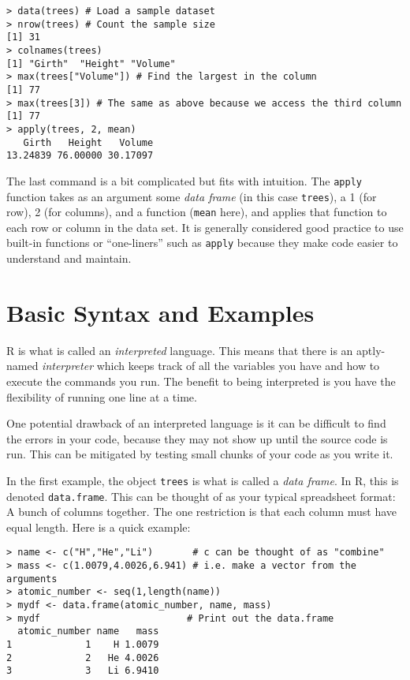 \documentclass[12pt]{article}
\begin{document}
\begin{verbatim}
> data(trees) # Load a sample dataset
> nrow(trees) # Count the sample size
[1] 31
> colnames(trees)
[1] "Girth"  "Height" "Volume"
> max(trees["Volume"]) # Find the largest in the column
[1] 77
> max(trees[3]) # The same as above because we access the third column
[1] 77
> apply(trees, 2, mean)
   Girth   Height   Volume 
13.24839 76.00000 30.17097
\end{verbatim}

The last command is a bit complicated but fits with intuition. The \verb|apply| function takes as an argument some \emph{data frame} (in this case \verb|trees|), a 1 (for row), 2 (for columns), and a function (\verb|mean| here), and applies that function to each row or column in the data set. It is generally considered good practice to use built-in functions or ``one-liners'' such as \verb|apply| because they make code easier to understand and maintain.

\section{Basic Syntax and Examples}

R is what is called an \emph{interpreted} language. This means that there is an aptly-named \emph{interpreter} which keeps track of all the variables you have and how to execute the commands you run. The benefit to being interpreted is you have the flexibility of running one line at a time.

One potential drawback of an interpreted language is it can be difficult to find the errors in your code, because they may not show up until the source code is run. This can be mitigated by testing small chunks of your code as you write it.

In the first example, the object \verb|trees| is what is called a \emph{data frame}. In R, this is denoted \verb|data.frame|. This can be thought of as your typical spreadsheet format: A bunch of columns together. The one restriction is that each column must have equal length. Here is a quick example:

\begin{verbatim}
> name <- c("H","He","Li")       # c can be thought of as "combine"
> mass <- c(1.0079,4.0026,6.941) # i.e. make a vector from the arguments
> atomic_number <- seq(1,length(name))
> mydf <- data.frame(atomic_number, name, mass)
> mydf                          # Print out the data.frame
  atomic_number name   mass
1             1    H 1.0079
2             2   He 4.0026
3             3   Li 6.9410
\end{verbatim}
\end{document}
